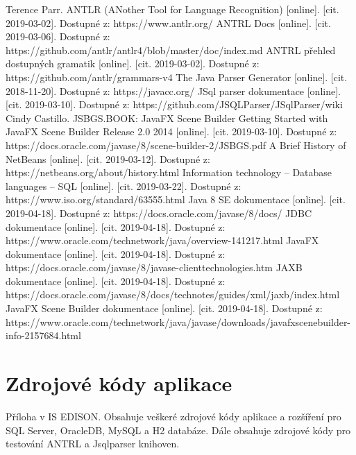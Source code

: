 \documentclass[czech,bachelor,public,dept460,male,cpdeclaration,twoside]{diploma}
\begin{document}
\begin{thebibliography}{99}
	 Terence Parr. ANTLR (ANother Tool for Language Recognition) [online]. [cit. 2019-03-02]. Dostupné z: https://www.antlr.org/
	 ANTRL Docs [online]. [cit. 2019-03-06]. Dostupné z: https://github.com/antlr/antlr4/blob/master/doc/index.md
	 ANTRL přehled dostupných gramatik [online]. [cit. 2019-03-02]. Dostupné z: https://github.com/antlr/grammars-v4
	 The Java Parser Generator [online]. [cit. 2018-11-20]. Dostupné z: https://javacc.org/
	 JSql parser dokumentace [online]. [cit. 2019-03-10]. Dostupné z: https://github.com/JSQLParser/JSqlParser/wiki
	 Cindy Castillo. JSBGS.BOOK: JavaFX Scene Builder Getting Started with JavaFX Scene Builder Release 2.0 2014 [online]. [cit. 2019-03-10]. Dostupné z: https://docs.oracle.com/javase/8/scene-builder-2/JSBGS.pdf
	 A Brief History of NetBeans [online]. [cit. 2019-03-12]. Dostupné z: https://netbeans.org/about/history.html
	 Information technology -- Database languages -- SQL [online]. [cit. 2019-03-22]. Dostupné z: https://www.iso.org/standard/63555.html
	 Java 8 SE dokumentace [online]. [cit. 2019-04-18]. Dostupné z: https://docs.oracle.com/javase/8/docs/
	 JDBC dokumentace [online]. [cit. 2019-04-18]. Dostupné z: https://www.oracle.com/technetwork/java/overview-141217.html
	 JavaFX dokumentace [online]. [cit. 2019-04-18]. Dostupné z: https://docs.oracle.com/javase/8/javase-clienttechnologies.htm
	 JAXB dokumentace [online]. [cit. 2019-04-18]. Dostupné z: https://docs.oracle.com/javase/8/docs/technotes/guides/xml/jaxb/index.html
	 JavaFX Scene Builder dokumentace [online]. [cit. 2019-04-18]. Dostupné z: https://www.oracle.com/technetwork/java/javase/downloads/javafxscenebuilder-info-2157684.html
	
	
	
	
	
	
	
	
	
	
	
	
	
	
\end{thebibliography}

\appendix %

\section{Zdrojové kódy aplikace}
Příloha v IS EDISON. Obsahuje veškeré zdrojové kódy aplikace a rozšíření pro SQL Server, OracleDB, MySQL a H2 databáze. Dále obsahuje zdrojové kódy pro testování ANTRL a Jsqlparser knihoven.
\end{document}
